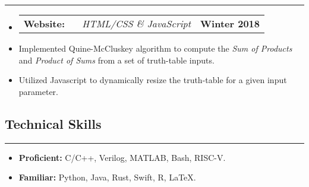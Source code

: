 \documentclass[10pt,letterpaper]{article}
\makeatletter
\newcommand{\header}[2]
{
	\begin{tabular*}{\linewidth}{l @{\extracolsep{\fill}} r}
		\hspace{-27pt} #1 & #2 \\
	\end{tabular*}
}
\newcommand{\sectionbreak}
{
	\vspace{-1.2em}
	\rule{\textwidth}{1.7pt}
	\vspace{-1.7em}
}
\makeatother
\begin{document}
\hrule

\begin{itemize}
	\item[]
		\header
			{	
				\textbf{Website: }
				\href{https://aashpointo.github.io/KmapWebsite/}{\emph{\underline{\smash{aashpointo.github.io/KmapWebsite}}}} \ \ \ \footnotesize \emph{HTML/CSS \& JavaScript}
				}
				{\textbf{Winter 2018}}
		\item
			Implemented Quine-McCluskey algorithm to compute the \emph{Sum of Products} and \emph{Product of Sums} from a set of truth-table inputs.
		\item
			Utilized Javascript to dynamically resize the truth-table for a given input parameter.

\end{itemize}

\vspace{-1.5em}
\subsection*{Technical Skills}
\sectionbreak

\begin{itemize}

	\item
		\textbf{Proficient:} C/C++, Verilog, MATLAB, Bash, RISC-V. 
	\item
		\textbf{Familiar:} Python, Java, Rust, Swift, R, \LaTeX.
\end{itemize}
\end{document}
